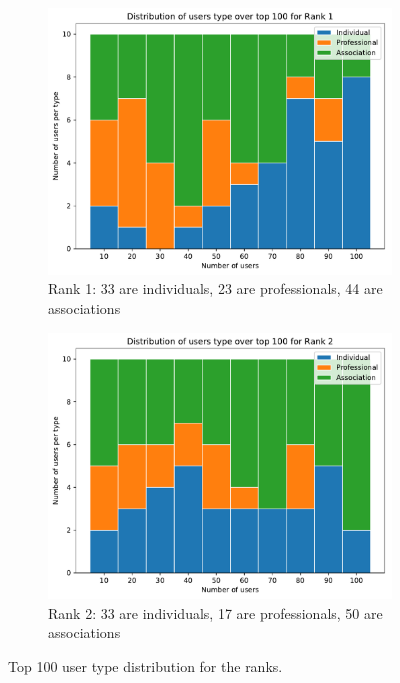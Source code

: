 \begin{figure}
	\centering
	\begin{subfigure}{.49\textwidth}
		\centering
		\includegraphics[width=\textwidth]{figures/rank1-distribution.pdf}
		\caption{Rank 1: 33 are individuals, 23 are professionals, 44 are associations}
		\label{fig:rank1-distribution}
	\end{subfigure}
	\hfill%
	\begin{subfigure}{.49\textwidth}
		\centering
		\includegraphics[width=1\textwidth]{figures/rank2-distribution.pdf}
		\caption{Rank 2: 33 are individuals, 17 are professionals, 50 are associations}
		\label{fig:rank2-distribution}
	\end{subfigure}
	\caption{Top 100 user type distribution for the ranks.}
	\label{fig:ranks-distribution}
\end{figure}
%